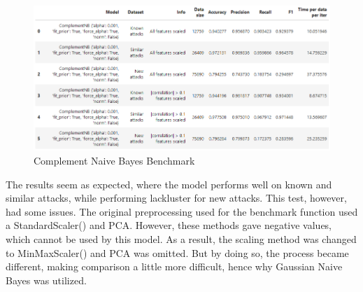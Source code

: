 \begin{figure}[!htb]
    \centering
    \includegraphics[width=\linewidth]{figures//naive_bayes/comp_nb_bench.png}
    \caption{Complement Naive Bayes Benchmark}%
    \label{fig:comp_nb_bench}
\end{figure}


The results seem as expected, where the model performs well on known and similar attacks, while performing lackluster for new attacks. This test, however, had some issues. The original preprocessing used for the benchmark function used a StandardScaler() and PCA. However, these methods gave negative values, which cannot be used by this model. As a result, the scaling method was changed to MinMaxScaler() and PCA was omitted. But by doing so, the process became different, making comparison a little more difficult, hence why Gaussian Naive Bayes was utilized.


